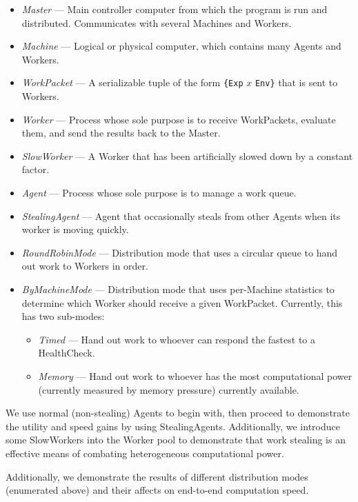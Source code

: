 \documentclass[letterpaper,twocolumn,10pt]{article}
\begin{document}
\begin{itemize}
    \item \textit{Master} --- Main controller computer from which the program
        is run and distributed. Communicates with several Machines and Workers.
    \item \textit{Machine} --- Logical or physical computer, which contains
        many Agents and Workers.
    \item \textit{WorkPacket} --- A serializable tuple of the form \verb|{Exp|
        $x$ \verb|Env}| that is sent to Workers.
    \item \textit{Worker} --- Process whose sole purpose is to receive
        WorkPackets, evaluate them, and send the results back to the Master.
    \item \textit{SlowWorker} --- A Worker that has been artificially slowed
        down by a constant factor.
    \item \textit{Agent} --- Process whose sole purpose is to manage a work
        queue.
    \item \textit{StealingAgent} --- Agent that occasionally steals from other
        Agents when its worker is moving quickly.
    \item \textit{RoundRobinMode} --- Distribution mode that uses a circular
        queue to hand out work to Workers in order.
    \item \textit{ByMachineMode} --- Distribution mode that uses per-Machine
        statistics to determine which Worker should receive a given WorkPacket.
        Currently, this has two sub-modes:
        \begin{itemize}
            \item \textit{Timed} --- Hand out work to whoever can respond the
                fastest to a HealthCheck.
            \item \textit{Memory} --- Hand out work to whoever has the most
                computational power (currently measured by memory pressure)
                currently available.
        \end{itemize}
\end{itemize}

We use normal (non-stealing) Agents to begin with, then proceed to demonstrate
the utility and speed gains by using StealingAgents. Additionally, we introduce
some SlowWorkers into the Worker pool to demonstrate that work stealing is an
effective means of combating heterogeneous computational power.

Additionally, we demonstrate the results of different distribution modes
(enumerated above) and their affects on end-to-end computation speed.
\end{document}
